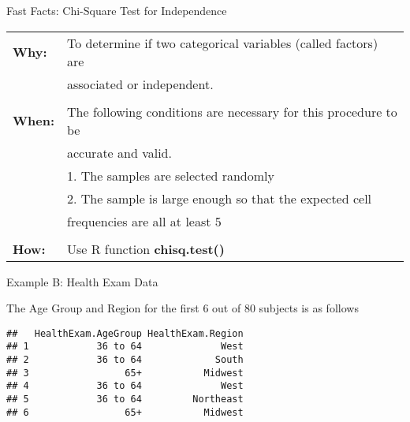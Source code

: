 \documentclass[12pt,ignorenonframetext,aspectratio=169]{beamer}
\begin{document}
\begin{frame}{Fast Facts: Chi-Square Test for Independence}

\begin{table}
        \centering
        \begin{tabular}{ll}
        \bf{Why}: & To determine if two categorical variables (called factors) are   \\ 
                  &  associated or independent.\\
                  &  \\
        \bf{When}: & The following conditions are necessary for this procedure to be \\
                  & accurate and valid.  \\
                  & \hspace{1em} 1. The samples are selected randomly \\
                  & \hspace{1em} 2. The sample is large enough so that the expected cell   \\
                  & \hspace{2.3em} frequencies are all at least 5 \\
                  &  \\
        \bf{How}: & Use R function \bf{chisq.test()}  \\
        \end{tabular}
\end{table}


\end{frame}

\begin{frame}[fragile]{Example B: Health Exam Data}

The Age Group and Region for the first 6 out of 80 subjects is as
follows

\begin{verbatim}
##   HealthExam.AgeGroup HealthExam.Region
## 1            36 to 64              West
## 2            36 to 64             South
## 3                 65+           Midwest
## 4            36 to 64              West
## 5            36 to 64         Northeast
## 6                 65+           Midwest
\end{verbatim}


\end{frame}
\end{document}
